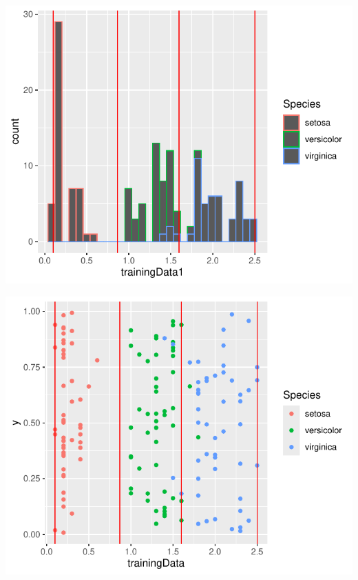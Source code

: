 \documentclass[
  12pt,
]{article}
\begin{document}
\begin{center}\includegraphics{Sprawozdanie2_files/figure-latex/frequences_najl-1} \end{center}

\begin{center}\includegraphics{Sprawozdanie2_files/figure-latex/frequences_najl-2} \end{center}
\end{document}
